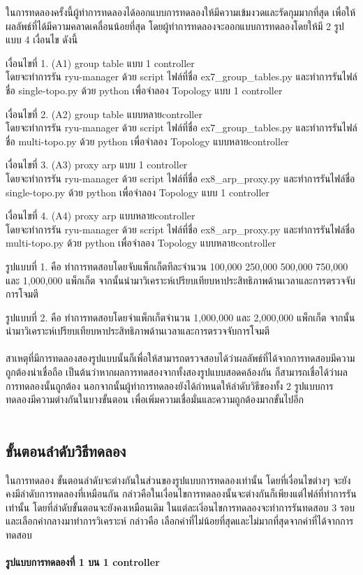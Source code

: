 ในการทดลองครั้งนี้ผู้ทำการทดลองได้ออกแบบการทดลองให้มีความเข้มงวดและรัดกุมมากที่สุด เพื่อให้ผลลัพธ์ที่ได้มีความคลาดเคลื่อนน้อยที่สุด
โดยผู้ทำการทดลองจะออกแบบการทดลองโดยให้มี 2 รูปแบบ 4 เงื่อนไข ดังนี้


เงื่อนไขที่ 1. (A1) group table แบบ 1 \gls{controller}\\
โดยจะทำการรัน ryu-manager ด้วย script ไฟล์ที่ชื่อ ex7\_group\_tables.py 
และทำการรันไฟล์ชื่อ single-topo.py ด้วย python เพื่อจำลอง Topology แบบ 1 \gls{controller}


เงื่อนไขที่ 2. (A2) group table แบบหลาย\gls{controller} \\
โดยจะทำการรัน ryu-manager ด้วย script ไฟล์ที่ชื่อ ex7\_group\_tables.py 
และทำการรันไฟล์ชื่อ multi-topo.py ด้วย python เพื่อจำลอง Topology แบบหลาย\gls{controller}


เงื่อนไขที่ 3. (A3) proxy arp แบบ 1 \gls{controller}\\
โดยจะทำการรัน ryu-manager ด้วย script ไฟล์ที่ชื่อ ex8\_arp\_proxy.py
และทำการรันไฟล์ชื่อ single-topo.py ด้วย python เพื่อจำลอง Topology แบบ 1 \gls{controller}

เงื่อนไขที่ 4. (A4) proxy arp แบบหลาย\gls{controller} \\
โดยจะทำการรัน ryu-manager ด้วย script ไฟล์ที่ชื่อ ex8\_arp\_proxy.py 
และทำการรันไฟล์ชื่อ multi-topo.py ด้วย python เพื่อจำลอง Topology แบบหลาย\gls{controller}

รูปแบบที่ 1. คือ ทำการทดสอบโดยจับแพ็กเก็ตทีละจำนวน 100,000 250,000 500,000 750,000 และ 1,000,000 แพ็กเก็ต
จากนั้นนำมาวิเคราะห์เปรียบเทียบหาประสิทธิภาพด้านเวลาและการตรวจจับการโจมตี

รูปแบบที่ 2. คือ ทำการทดสอบโดยจำแพ็กเก็ตจำนวน 1,000,000 และ 2,000,000 แพ็กเก็ต
จากนั้นนำมาวิเคราะห์เปรียบเทียบหาประสิทธิภาพด้านเวลาและการตรวจจับการโจมตี
\\\\
สาเหตุที่มีการทดลองสองรูปแบบนั้นก็เพื่อให้สามารถตรวจสอบได้ว่าผลลัพธ์ที่ได้จากการทดสอบมีความถูกต้องน่าเชื่อถือ
เป็นต้นว่าหากผลการทดสองจากทั้งสองรูปแบบสอดคล้องกัน ก็สามารถเชื่อได้ว่าผลการทดลองนั้นถูกต้อง นอกจากนั้นผู้ทำการทดลองยังได้กำหนดให้ลำดับวิธีของทั้ง 2 รูปแบบการทดลองมีความต่างกันในบางขั้นตอน เพื่อเพิ่มความเชื่อมั่นและความถูกต้องมากขั้นไปอีก
\\\\
\subsection{ขั้นตอนลำดับวิธีทดลอง}
\indent\indent
ในการทดลอง ขั้นตอนลำดับจะต่างกันในส่วนของรูปแบบการทดลองเท่านั้น โดยที่เงื่อนไขต่างๆ จะยังคงมีลำดับการทดลองที่เหมือนกัน กล่าวคือในเงื่อนไขการทดลองนั้นจะต่างกันก็เพียงแต่ไฟล์ที่ทำการรันเท่านั้น โดยที่ลำดับขั้นตอนจะยังคงเหมือนเดิม 
ในแต่ละเงิ่อนไขการทดลองจะทำการรันทดสอบ 3 รอบ และเลือกค่ากลางมาทำการวิเคราะห์ กล่าวคือ เลือกค่าที่ไม่น้อยที่สุดและไม่มากที่สุดจากค่าที่ได้จากการทดสอบ
\\\\
\textbf{รูปแบบการทดลองที่ 1 บน 1 \gls{controller}}

